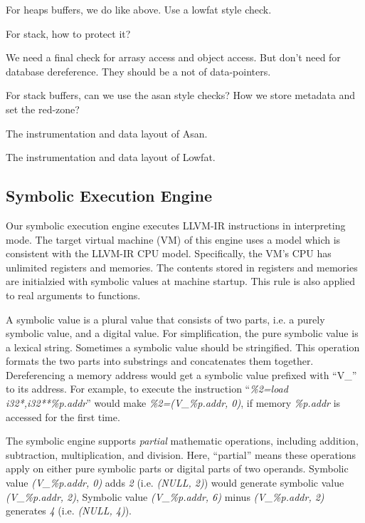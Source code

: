 For heaps buffers, we do like above. Use a lowfat style check.

For stack, how to protect it?

We need a final check for arrasy access and object access.
But don't need for database dereference.
They should be a not of data-pointers.


For stack buffers, can we use the asan style checks?
How we store metadata and set the red-zone?


The instrumentation and data layout of Asan.

The instrumentation and data layout of Lowfat.

\subsection{Symbolic Execution Engine}

Our symbolic execution engine executes LLVM-IR instructions in interpreting mode.
The target virtual machine (VM) of this engine uses a model which is consistent with the LLVM-IR CPU model.
Specifically, the VM's CPU has unlimited registers and memories.
The contents stored in registers and memories are initialzied with symbolic values at machine startup.
This rule is also applied to real arguments to functions.

A symbolic value is a plural value that consists of two parts, i.e. a purely symbolic value, and a digital value.
For simplification, the pure symbolic value is a lexical string.
Sometimes a symbolic value should be stringified. This operation formats the two parts into substrings and concatenates them together.
Dereferencing a memory address would get a symbolic value prefixed with ``V\_'' to its address.
For example, to execute the instruction
``\textit{\%2=load i32*,i32**\%p.addr}'' would make \textit{\%2=(V\_\%p.addr, 0)}, if memory \textit{\%p.addr} is accessed for the first time.

The symbolic engine supports \textit{partial} mathematic operations, including addition, subtraction, multiplication, and division.
Here, ``partial'' means these operations apply on either pure symbolic parts or digital parts of two operands.
Symbolic value \textit{(V\_\%p.addr, 0)} adds \textit{2} (i.e. \textit{(NULL, 2)}) would generate symbolic value \textit{(V\_\%p.addr, 2)},
Symbolic value \textit{(V\_\%p.addr, 6)} minus \textit{(V\_\%p.addr, 2)} generates \textit{4} (i.e. \textit{(NULL, 4)}).

